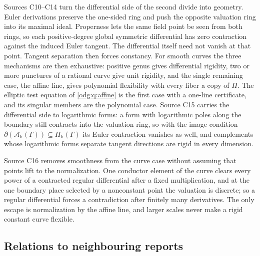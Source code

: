 \documentclass[11pt,oneside]{article}
\numberwithin{equation}{section}
\theoremstyle{definition}
\theoremstyle{remark}
\newcommand{\crA}{\mathcal A_\Bbbk(\Gamma)}
\newcommand{\crP}{\Pi_\Bbbk(\Gamma)}
\begin{document}
Sources C10--C14 turn the differential side of the second divide into geometry.
Euler derivations preserve the one-sided ring and push the opposite valuation ring
into its maximal ideal. Properness lets the same field point be seen from
both rings, so each positive-degree global symmetric differential has zero
contraction against the induced Euler tangent. The differential itself need
not vanish at that point. Tangent separation then forces constancy. For
smooth curves the three mechanisms are then exhaustive: positive genus gives
differential rigidity, two or more punctures of a rational curve give unit rigidity,
and the single remaining case, the affine line, gives polynomial flexibility with
every fiber a copy of $\Pi$. The elliptic test equation of \cref{odg:q:affine} is the
first case with a one-line certificate, and its singular members are the polynomial
case. Source C15 carries the differential side to logarithmic forms: a form with
logarithmic poles along the boundary still contracts into the valuation ring, so with the
image condition $\partial(\crA)\subseteq\crP$ its Euler contraction
vanishes as well, and complements whose
logarithmic forms separate tangent directions are rigid in every dimension.

Source C16 removes smoothness from the curve case without assuming that points
lift to the normalization. One conductor element of the curve clears every power of a contracted
regular differential after a fixed multiplication, and at the one boundary place selected
by a nonconstant point the valuation is discrete; so a regular differential forces a
contradiction after finitely many derivatives. The only escape is normalization by the
affine line, and larger scales never make a rigid constant curve flexible.

\subsection{Relations to neighbouring reports}\label{odg:sub:neighbours}
\end{document}
